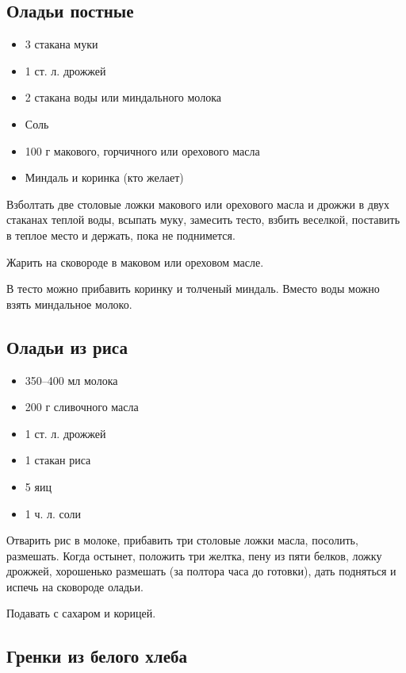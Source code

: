 \subsection{Оладьи постные}

\begin{itemize}
	\item 3 стакана муки
    \item 1 ст. л. дрожжей
    \item 2 стакана воды или миндального молока 
    \item Соль
    \item 100 г макового, горчичного или орехового масла 
    \item Миндаль и коринка (кто желает)
\end{itemize}

Взболтать две столовые ложки макового или орехового масла и дрожжи в двух стаканах теплой воды, всыпать муку, замесить тесто, взбить веселкой, поставить в теплое место и держать, пока не поднимется.

Жарить на сковороде в маковом или ореховом масле.

В тесто можно прибавить коринку и толченый миндаль. Вместо воды можно взять миндальное молоко.

\subsection{Оладьи из риса}

\begin{itemize}
	\item 350–400 мл молока
    \item 200 г сливочного масла
    \item 1 ст. л. дрожжей 
    \item 1 стакан риса 
    \item 5 яиц 
    \item 1 ч. л. соли
\end{itemize}

Отварить рис в молоке, прибавить три столовые ложки масла, посолить, размешать. Когда остынет, положить три желтка, пену из пяти белков, ложку дрожжей, хорошенько размешать (за полтора часа до готовки), дать подняться и испечь на сковороде оладьи.

Подавать с сахаром и корицей.

\subsection{Гренки из белого хлеба}

